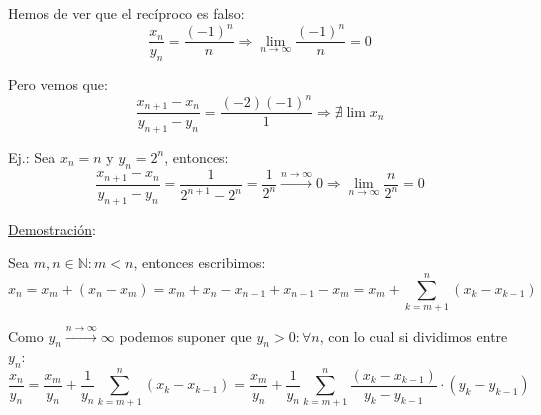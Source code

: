 \documentclass[10pt,a4paper,openright]{book}
\begin{document}
Hemos de ver que el recíproco es falso:
$$\frac{x_n}{y_n}=\frac{(-1)^n}{n}\Rightarrow \lim_{n\rightarrow \infty} \frac{(-1)^n}{n}=0$$

Pero vemos que:
$$\frac{x_{n+1}-x_n}{y_{n+1}-y_n}=\frac{(-2)(-1)^n}{1}\Rightarrow \nexists \lim x_n$$

Ej.: Sea $x_n=n$ y $y_n=2^n$, entonces:
$$\frac{x_{n+1}-x_n}{y_{n+1}-y_n}=\frac{1}{2^{n+1}-2^n}=\frac{1}{2^n}\stackrel{n\rightarrow \infty}{\rightarrow} 0\Rightarrow \lim_{n\rightarrow \infty}\frac{n}{2^n}=0$$

\underline{Demostración}:\par
Sea $m,n\in \mathbb N: m<n$, entonces escribimos:
$$x_n=x_m+(x_n-x_m)=x_m+x_n-x_{n-1}+x_{n-1}-x_m=x_m+\sum_{k=m+1}^n (x_k-x_{k-1})$$

Como $y_n\stackrel{n\rightarrow\infty}{\rightarrow} \infty$ podemos suponer que $y_n>0: \forall n$, con lo cual si dividimos entre $y_n$:
$$\frac{x_n}{y_n}=\frac{x_m}{y_n}+\frac{1}{y_n}\sum_{k=m+1}^n (x_k-x_{k-1})=\frac{x_m}{y_n}+\frac{1}{y_n}\sum_{k=m+1}^n \frac{(x_k-x_{k-1})}{y_k-y_{k-1}}\cdot (y_k-y_{k-1})$$
\end{document}
